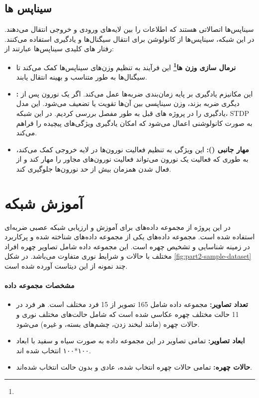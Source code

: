     \subsection*{سیناپس ها}
        سیناپس‌ها اتصالاتی هستند که اطلاعات را بین لایه‌های ورودی و خروجی انتقال می‌دهند. در این شبکه، سیناپس‌ها از کانولوشن برای انتقال سیگنال‌ها و یادگیری استفاده می‌کنند. رفتار های کلیدی سیناپس‌ها عبارتند از:
        \begin{itemize}
            \item \textbf{نرمال سازی وزن ها\footnote{}}  این فرآیند به تنظیم وزن‌های سیناپس‌ها کمک می‌کند تا سیگنال‌ها به طور متناسب و بهینه انتقال یابند.
            \item \textbf{ :} این مکانیزم یادگیری بر پایه زمان‌بندی ضربه‌ها عمل می‌کند. اگر یک نورون پس از دیگری ضربه بزند، وزن سیناپسی بین آن‌ها تقویت یا تضعیف می‌شود. این مدل یادگیری را در پروژه های قبل به طور مفصل بررسی کردیم. در این شبکه، 
            STDP 
            به صورت کانولوشنی اعمال می‌شود که امکان یادگیری ویژگی‌های پیچیده را فراهم می‌کند.
            \item \textbf{مهار جانبی (): }
            این ویژگی به تنظیم فعالیت نورون‌ها در لایه خروجی کمک می‌کند، به طوری که فعالیت یک نورون می‌تواند فعالیت نورون‌های مجاور را مهار کند و از فعال شدن همزمان بیش از حد نورون‌ها جلوگیری کند.
        \end{itemize}

    \section{آموزش شبکه}
        در این پروژه از مجموعه داده‌های 
        برای آموزش و ارزیابی شبکه عصبی ضربه‌ای استفاده شده است. مجموعه داده‌های 
        یکی از مجموعه داده‌های شناخته شده و پرکاربرد در زمینه شناسایی و تشخیص چهره است. این مجموعه داده شامل تصاویر چهره افراد مختلف با حالات و شرایط نوری متفاوت می‌باشد. در شکل 
        \ref{fig:part2-sample-dataset}
        چند نمونه از این دیتاست آورده شده است.
        \paragraph*{مشخصات مجموعه داده }
        \begin{itemize}
            \item \textbf{تعداد تصاویر:} مجموعه داده 
            شامل 165 تصویر از 
            15 
            فرد مختلف است. هر فرد در 
            11 
            حالت مختلف چهره عکاسی شده است که شامل حالت‌های مختلف نوری و حالات چهره (مانند لبخند زدن، چشم‌های بسته، و غیره) می‌شود.
            \item \textbf{ابعاد تصاویر:} تمامی تصاویر در این مجموعه داده به صورت سیاه و سفید با ابعاد
            ۱۰۰*۱۰۰
            انتخاب شده اند.
            \item \textbf{حالات چهره:} تمامی حالات چهره انتخاب شده، عادی و بدون حالت انتخاب شده‌اند.
        \end{itemize}


